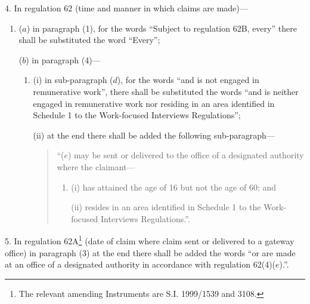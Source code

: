 \documentclass[12pt,a4paper]{article}
\begin{document}
4.  In regulation 62 (time and manner in which claims are made)—
\begin{enumerate}\item[]
($a$) in paragraph (1), for the words “Subject to regulation 62B, every” there shall be substituted the word “Every”;

($b$) in paragraph (4)—
\begin{enumerate}\item[]
(i) in sub-paragraph ($d$), for the words “and is not engaged in remunerative work”, there shall be substituted the words “and is neither engaged in remunerative work nor residing in an area identified in Schedule 1 to the Work-focused Interviews Regulations”;

(ii) at the end there shall be added the following sub-paragraph—
\begin{quotation}
“($e$) may be sent or delivered to the office of a designated authority where the claimant—
\begin{enumerate}\item[]
(i) has attained the age of 16 but not the age of 60; and

(ii) resides in an area identified in Schedule 1 to the Work-focused Interviews Regulations.”.
\end{enumerate}
\end{quotation}
\end{enumerate}
\end{enumerate}

\medskip

5.  In regulation 62A\footnote{\frenchspacing The relevant amending Instruments are S.I. 1999/1539 and 3108.} (date of claim where claim sent or delivered to a gateway office) in paragraph (3) at the end there shall be added the words “or are made at an office of a designated authority in accordance with regulation 62(4)($e$).”.

\medskip
\end{document}
